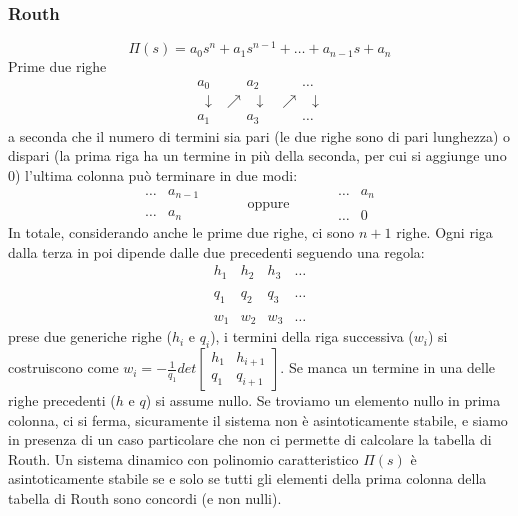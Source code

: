 \begin{landscape}
    \subsubsection*{Routh}
    \[
        \Pi(s) = a_0s^n + a_1 s^{n-1} + \dots + a_{n-1}s + a_n
    \]
    Prime due righe
    \[
        \begin{matrix}
            a_0 & \;\;\;\;\;\; a_2 & \;\;\;\;\;\;\dots\\
            \;\;\downarrow & \nearrow \;\; \downarrow & \nearrow \;\; \downarrow\\
            a_1 & \;\;\;\;\;\; a_3 & \;\;\;\;\;\;\dots 
        \end{matrix}
    \]
    a seconda che il numero di termini sia pari (le due righe sono di pari lunghezza) o dispari (la prima riga ha un termine in più della seconda, per cui si aggiunge uno $0$) l'ultima colonna può terminare in due modi:
    \[
        \begin{matrix}
            \dots & a_{n-1}\\
            \;\\
            \dots & a_n
        \end{matrix}\;\;\;\;\;\;\;\;\;\;\; \text{oppure}\;\;\;\;\;\;\;\;\;\;\; \begin{matrix}
            \dots &a_n\\
            \;\\
            \dots & 0 
        \end{matrix}
    \]
    In totale, considerando anche le prime due righe, ci sono $n+1$ righe.\newline
    Ogni riga dalla terza in poi dipende dalle due precedenti seguendo una regola:
    \[
        \begin{matrix}
            h_1 & h_2 & h_3 &\dots\\
            \;\\
            q_1 & q_2 & q_3 & \dots\\
            \;\\
            w_1 & w_2 & w_3 & \dots
        \end{matrix}
    \]
    prese due generiche righe ($h_i$ e $q_i$), i termini della riga successiva ($w_i$) si costruiscono come $w_i = - \frac{1}{q_1} det\left[\begin{matrix}
        h_1 & h_{i+1} \\
        q_1 & q_{i+1}
    \end{matrix}\right]$.\newline
    Se manca un termine in una delle righe precedenti ($h$ e $q$) si assume nullo.\newline
    Se troviamo un elemento nullo in prima colonna, ci si ferma, sicuramente il sistema non è asintoticamente stabile, e siamo in presenza di un caso particolare che non ci permette di calcolare la tabella di Routh.\newline
    \newline
    Un sistema dinamico con polinomio caratteristico $\Pi(s)$ è asintoticamente stabile se e solo se tutti gli elementi della prima colonna della tabella di Routh sono concordi (e non nulli).

\end{landscape}
